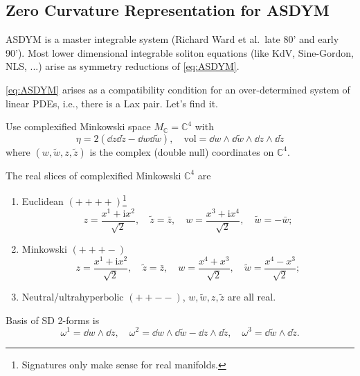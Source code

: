 \documentclass[a4paper,11pt]{article}
\begin{document}
    \subsection{Zero Curvature Representation for ASDYM}
     ASDYM is a master integrable system (Richard Ward et al.~late 80' and early 90'). Most lower dimensional integrable soliton equations (like KdV, Sine-Gordon, NLS, ...) arise as symmetry reductions of \eqref{eq:ASDYM}. 
    
    \eqref{eq:ASDYM} arises as a compatibility condition for an over-determined system of linear PDEs, i.e., there is a Lax pair. Let's find it. 

    Use complexified Minkowski space $M_{\mathbb{C}} = \mathbb{C}^4$ with 
    \begin{equation}
        \eta = 2 (\dd{z} \dd{\tilde z} - \dd{w} \dd{\tilde w}), \quad \text{vol} = \dd{w} \wedge \dd{\tilde w} \wedge \dd{z} \wedge \dd{\tilde z}
    \end{equation}
    where $(w, \tilde w, z, \tilde z)$ is the complex (double null) coordinates on $\mathbb{C}^4$.

    The real slices of complexified Minkowski $\mathbb{C}^4$ are
    \begin{enumerate}[1)]
        \item Euclidean $({+}{+}{+}{+})$\footnote{Signatures only make sense for real manifolds.} \begin{equation}
            z = \frac{x^1 + \mathrm{i} x^2}{\sqrt{2}}, \quad \tilde z = \bar z, \quad w = \frac{x^3 + \mathrm{i} x^4}{\sqrt{2}}, \quad \tilde w = - \bar w;
        \end{equation}
        \item Minkowski $({+}{+}{+}{-})$ \begin{equation}
            z = \frac{x^1 + \mathrm{i} x^2}{\sqrt{2}}, \quad \tilde z = \bar z, \quad w = \frac{x^4 + x^3}{\sqrt{2}}, \quad \tilde w = \frac{x^4 - x^3}{\sqrt{2}};
        \end{equation}
        \item Neutral/ultrahyperbolic $({+}{+}{-}{-})$, $w, \tilde w, z, \tilde z$ are all real.
    \end{enumerate}

    Basis of SD 2-forms is 
    \begin{equation}
        \omega^1 = \dd{w} \wedge \dd{z}, \quad \omega^2 = \dd{w} \wedge \dd{\tilde w} - \dd{z} \wedge \dd{\tilde z}, \quad \omega^3 = \dd{\tilde w} \wedge \dd{\tilde z}.
    \end{equation}
\end{document}
